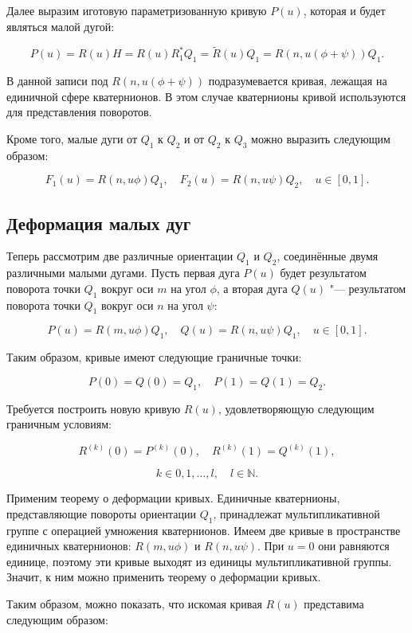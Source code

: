 Далее выразим иготовую параметризованную кривую $P(u)$, которая и будет являться малой дугой:

\begin{equation}
P(u)=R(u)H=R(u)R_1^*Q_1=\tilde R(u)Q_1=R(n,u(\phi+\psi))Q_1.
\label{orientation-arc}
\end{equation}

В данной записи под $R(n,u(\phi+\psi))$ подразумевается кривая, лежащая на единичной сфере кватернионов. В этом
случае кватернионы кривой используются для представления поворотов.

Кроме того, малые дуги от $Q_1$ к $Q_2$ и от $Q_2$ к $Q_3$ можно выразить следующим образом:

$$
F_1(u)=R(n,u\phi)Q_1, \quad F_2(u)=R(n,u\psi)Q_2, \quad u \in [0,1].
$$

\subsection*{Деформация малых дуг}

Теперь рассмотрим две различные ориентации $Q_1$ и $Q_2$, соединённые двумя различными малыми дугами. Пусть первая дуга
$P(u)$ будет результатом поворота точки $Q_1$ вокруг оси $m$ на угол $\phi$, а вторая дуга $Q(u)$ "--- результатом
поворота точки $Q_1$ вокруг оси $n$ на угол $\psi$:

$$
P(u)=R(m,u\phi)Q_1, \quad Q(u)=R(n,u\psi)Q_1, \quad u \in [0,1].
$$

Таким образом, кривые имеют следующие граничные точки:

$$
P(0)=Q(0)=Q_1, \quad P(1)=Q(1)=Q_2.
$$

Требуется построить новую кривую $R(u)$, удовлетворяющую следующим граничным условиям:

$$
R^{(k)}(0)=P^{(k)}(0), \quad R^{(k)}(1)=Q^{(k)}(1),
$$

$$
k \in {0,1,\dots,l}, \quad l \in \mathbb{N}.
$$

Применим теорему о деформации кривых. Единичные кватернионы, представляющие повороты ориентации $Q_1$, принадлежат
мультипликативной группе с операцией умножения кватернионов. Имеем две кривые в пространстве единичных кватернионов:
$R(m,u\phi)$ и $R(n,u\psi)$. При $u=0$ они равняются единице, поэтому эти кривые выходят из единицы мультипликативной
группы. Значит, к ним можно применить теорему о деформации кривых.

Таким образом, можно показать, что искомая кривая $R(u)$ представима следующим образом:

